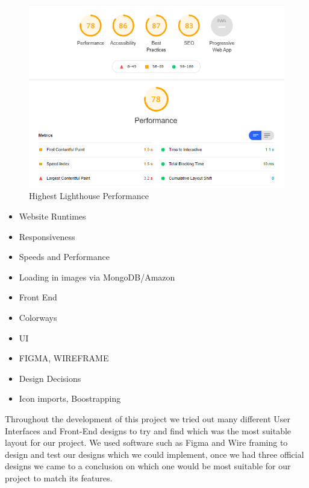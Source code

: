 \begin{figure}[H]
  \centering
  \includegraphics[scale=0.6]{img/best_lighthouse.jpg}
  \caption{Highest Lighthouse Performance}
  \label{fig:highest_lighthouse}
\end{figure}

\newline

\begin{itemize}
    \item Website Runtimes
    \item Responsiveness
    \item Speeds and Performance
    \item Loading in images via MongoDB/Amazon
\end{itemize}

\begin{itemize}
    \item Front End
    \item Colorways
    \item UI
    \item FIGMA, WIREFRAME
    \item Design Decisions
    \item Icon imports, Boostrapping
\end{itemize}

Throughout the development of this project we tried out many different User Interfaces and Front-End designs to try and find which was the most suitable layout for our project. We used software such as Figma and Wire framing to design and test our designs which we could implement, once we had three official designs we came to a conclusion on which one would be most suitable for our project to match its features.

